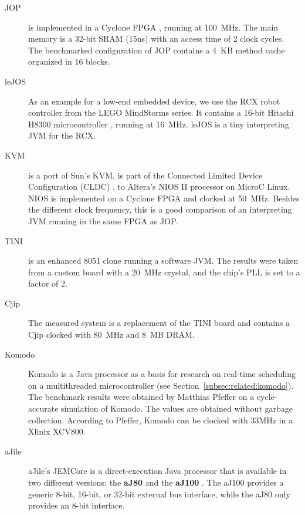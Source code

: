 \begin{description}
    \item[JOP]
is implemented in a Cyclone FPGA \cite{AltCyc}, running at 100~MHz.
The main memory is a 32-bit SRAM (15ns) with an access time of 2
clock cycles. The benchmarked configuration of JOP contains a 4~KB
method cache organized in 16 blocks.

    \item[leJOS] As an example for a low-end embedded device, we
        use the RCX robot controller from the LEGO MindStorms
        series. It contains a 16-bit Hitachi H8300
        microcontroller \cite{hitachi:h8}, running at 16~MHz.
        leJOS \cite{lejos} is a tiny interpreting JVM for the
        RCX.

    \item[KVM] is a port of Sun's KVM, is part of the Connected
        Limited Device Configuration (CLDC) \cite{J2ME}, to
        Altera's NIOS II processor on MicroC Linux. NIOS is
        implemented on a Cyclone FPGA and clocked at 50~MHz.
        Besides the different clock frequency, this is a good
        comparison of an interpreting JVM running in the same
        FPGA as JOP.

    \item[TINI]
is an enhanced 8051 clone running a software JVM. The results were
taken from a custom board with a 20~MHz crystal, and the chip's PLL
is set to a factor of 2.

    \item[Cjip]
The measured system \cite{SNAP} is a replacement of the TINI board
and contains a Cjip \cite{Cjip} clocked with 80~MHz and 8~MB DRAM.

    \item[Komodo]
Komodo \cite{komodo2003} is a Java processor as a basis for research
on real-time scheduling on a multithreaded microcontroller (see
Section~\ref{subsec:related:komodo}). The benchmark results were
obtained by Matthias Pfeffer \cite{Pfeffer} on a cycle-accurate
simulation of Komodo. The values are obtained without garbage
collection. According to Pfeffer, Komodo can be clocked with 33MHz
in a Xlinix XCV800.

    \item[aJile] aJile's JEMCore is a direct-execution Java
        processor that is available in two different versions:
        the \textbf{aJ80} and the \textbf{aJ100} \cite{aJile}.
        The aJ100 provides a generic 8-bit, 16-bit, or 32-bit
        external bus interface, while the aJ80 only provides an
        8-bit interface.



\end{description}
